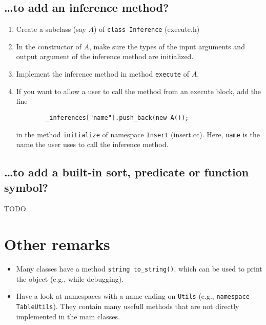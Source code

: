 \documentclass{article}
\begin{document}
\subsection*{\ldots to add an inference method?}
\begin{enumerate}
	\item Create a subclass (say $A$) of \texttt{class Inference} (execute.h)
	\item In the constructor of $A$, make sure the types of the input arguments and output argument of the inference method are initialized.
	\item Implement the inference method in method \texttt{execute} of $A$.
	\item If you want to allow a user to call the method from an execute block, add the line 
	\begin{lstlisting}
		_inferences["name"].push_back(new A());
	\end{lstlisting}
	in the method \texttt{initialize} of namespace \texttt{Insert} (insert.cc). Here, \texttt{name} is the name the user uses to call the inference method.
\end{enumerate}

\subsection*{\ldots to add a built-in sort, predicate or function symbol?}

TODO

\section{Other remarks}

\begin{itemize}
	\item Many classes have a method \texttt{string to\_string()}, which can be used to print the object (e.g., while debugging).
	\item Have a look at namespaces with a name ending on \texttt{Utils} (e.g., \texttt{namespace TableUtils}). They contain many usefull methods that are not directly implemented in the main classes.
\end{itemize}
\end{document}
